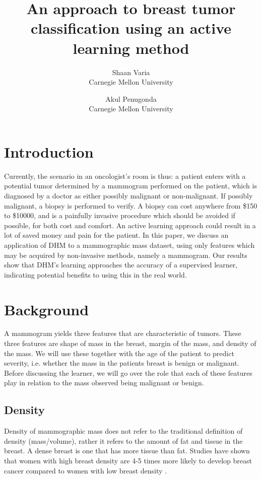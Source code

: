 \documentclass[12pt]{article}
\title{An approach to breast tumor classification using an active learning method}
\author{Shaan Varia \\ Carnegie Mellon University \and Akul Penugonda \\ Carnegie Mellon University}
\begin{document}
\maketitle

\section{Introduction}

Currently, the scenario in an oncologist's room is thus: a patient enters with a potential tumor determined by a mammogram performed on the patient, which is diagnosed by a doctor as either possibly malignant or non-malignant. If possibly malignant, a biopsy is performed to verify. A biopsy can cost anywhere from \$150 to \$10000, and is a painfully invasive procedure which should be avoided if possible, for both cost and comfort. An active learning approach could result in a lot of saved money and pain for the patient. In this paper, we discuss an application of DHM to a mammographic mass dataset, using only features which may be acquired by non-invasive methods, namely a mammogram.  Our results show that DHM's learning approaches the accuracy of a supervised learner, indicating potential benefits to using this in the real world.

\section{Background}

A mammogram yields three features that are characteristic of tumors. These three features are shape of mass in the breast, margin of the mass, and density of the mass. We will use these together with the age of the patient to predict severity, i.e. whether the mass in the patients breast is benign or malignant. Before discussing the learner, we will go over the role that each of these features play in relation to the mass observed being malignant or benign.

\subsection{Density}

Density of mammographic mass does not refer to the traditional definition of density (mass/volume), rather it refers to the amount of fat and tissue in the breast. A dense breast is one that has more tissue than fat. Studies have shown that women with high breast density are 4-5 times more likely to develop breast cancer compared to women with low breast density \cite{boyd, white}. 
\end{document}
